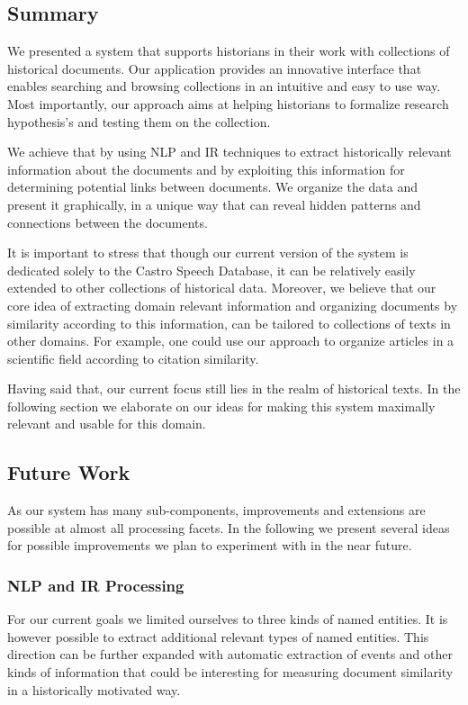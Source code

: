 \subsection {Summary}
\label{sec:summary}

We presented a system that supports historians in their work with collections of historical documents. 
Our application provides an innovative interface that enables searching and browsing collections in an intuitive and easy to use way.
Most importantly, our approach aims at helping historians to formalize research hypothesis's and testing them on the collection.

We achieve that by using NLP and IR techniques to extract historically relevant information about the documents and by exploiting
this information for determining potential links between documents. We organize the data and present it graphically,
in a unique way that can reveal hidden patterns and connections between the documents.
 
It is important to stress that though our current version of the system is dedicated solely to the Castro Speech Database, 
it can be relatively easily extended to other collections of historical data. Moreover, we believe that our core idea of
extracting domain relevant information and organizing documents by similarity according to this information, can be tailored
to collections of texts in other domains. For example, one could use our approach to organize articles in a scientific field 
according to citation similarity. 

Having said that, our current focus still lies in the realm of historical texts. In the following section we elaborate on
our ideas for making this system maximally relevant and usable for this domain. 
 

\subsection {Future Work}
\label{sec:future_work}
As our system has many sub-components, improvements and extensions are possible
at almost all processing facets. In the following we present several ideas for possible improvements we plan to experiment with in the
near future.

\subsubsection{NLP and IR Processing}
For our current goals we limited ourselves to three kinds of named entities. 
It is however possible to extract additional relevant types of named entities. 
This direction can be further expanded with automatic extraction of events and other kinds of information that could be interesting for measuring 
document similarity in a historically motivated way.  

